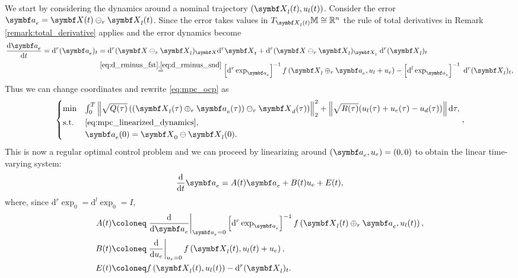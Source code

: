 We start by considering the dynamics around a nominal trajectory $(\X_l(t), u_l(t))$. Consider the error $\a_e = \X(t) \ominus_r \X_l(t)$. Since the error takes values in $T_{\X_l(t)} \M \cong \mathbb{R}^n$ the rule of total derivatives in Remark \ref{remark:total_derivative} applies and the error dynamics become
\begin{equation}
  \label{eq:mpc_linearized_dynamics}
  \begin{aligned}
    \frac{\mathrm{d} \a_e}{\mathrm{d}t} = \mathrm{d}^r (\a_e)_t
     & = \mathrm{d}^r (\X \ominus_r \X_l)_\X \mathrm{d}^r \X_t + \mathrm{d}^r (\X \ominus_r \X_l)_{\X_l} \; \mathrm{d}^r (\X_l)_t
    \\
     & \overset{\eqref{eq:d_rminus_fst}, \eqref{eq:d_rminus_snd}}= \left[\mathrm{d}^r \exp_{\a_e} \right]^{-1} f\left(\X_l \oplus_r \a_e, u_l + u_e \right) - \left[\mathrm{d}^l \exp _{\a_e} \right]^{-1} \; \mathrm{d}^r (\X_l)_t,
  \end{aligned}
\end{equation}
Thus we can change coordinates and rewrite \eqref{eq:mpc_ocp} as
\begin{equation}
  \label{eq:mpc_ocp_error}
  \begin{cases}
    \min        & \int_0^T \left\| \sqrt{Q(\tau)} \left( \left( \X_l(\tau) \oplus_r \a_e(\tau) \right) \ominus_r \X_d(\tau) \right)  \right\|_2^2 + \left\| \sqrt{R(\tau)} (u_l(\tau) + u_e(\tau) - u_d(\tau)) \right\|  \mathrm{d} \tau, \\

    \text{s.t.} & \eqref{eq:mpc_linearized_dynamics},                                                                                                                                                                                     \\
                & \a_e(0) = \X_0 \ominus \X_l(0).
  \end{cases},
\end{equation}
This is now a regular optimal control problem and we can proceed by linearizing around $(\a_e, u_e) = (0, 0)$ to obtain the linear time-varying system:
\begin{equation}
  \frac{\mathrm{d}}{\mathrm{d}t} \a_e = A(t) \a_e + B(t) u_e + E(t),
\end{equation}
where, since $\mathrm{d}^r \exp_0 = \mathrm{d}^l \exp_0 = I$,
\begin{align}
  A(t) & \coloneq \left. \frac{\mathrm{d}}{\mathrm{d}\a_e} \right|_{\a_e = 0} \left[\mathrm{d}^r \exp_{\a_e} \right]^{-1} f\left(\X_l(t) \oplus_r \a_e, u_l(t)  \right),  \\
  B(t) & \coloneq \left. \frac{\mathrm{d}}{\mathrm{d}u_e} \right|_{u_e = 0} f\left(\X_l(t), u_l(t) + u_e \right),  \\
  E(t) & \coloneq f\left(\X_l(t), u_l(t) \right) - \mathrm{d}^r(\X_l)_t.
\end{align}
